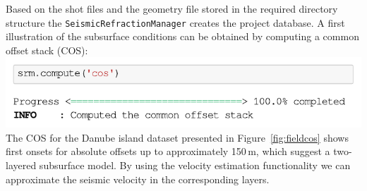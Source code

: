 \documentclass[a4paper,fleqn]{cas-sc}
\begin{document}
Based on the shot files and the geometry file stored in the required directory structure the \texttt{SeismicRefractionManager} creates the project database.
A first illustration of the subsurface conditions can be obtained by computing a common offset stack (COS):
\newline
\includegraphics[width=.5\textwidth]{./figures/plotcos_danube.pdf}
\newline
The COS for the Danube island dataset presented in Figure~\ref{fig:fieldcos} shows first onsets for absolute offsets up to approximately 150\,m, which suggest a two-layered subsurface model. By using the velocity estimation functionality we can approximate the seismic velocity in the corresponding layers.
\end{document}
